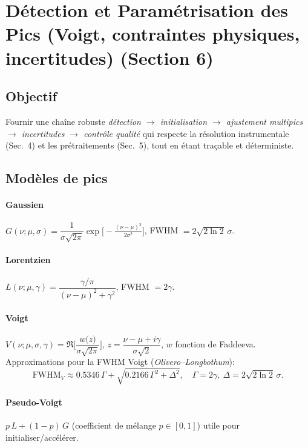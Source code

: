 
\section{Détection et Paramétrisation des Pics (Voigt, contraintes physiques, incertitudes) (Section 6)}

\subsection{Objectif}
Fournir une chaîne robuste \emph{détection $\rightarrow$ initialisation $\rightarrow$ ajustement multipics $\rightarrow$ incertitudes $\rightarrow$ contrôle qualité} qui respecte la résolution instrumentale (Sec.~4) et les prétraitements (Sec.~5), tout en étant traçable et déterministe.

\subsection{Modèles de pics}
\paragraph{Gaussien} $G(\nu;\mu,\sigma)=\dfrac{1}{\sigma\sqrt{2\pi}}\exp\!\big[-\tfrac{(\nu-\mu)^2}{2\sigma^2}\big]$, FWHM $=2\sqrt{2\ln2}\,\sigma$.
\paragraph{Lorentzien} $L(\nu;\mu,\gamma)=\dfrac{\gamma/\pi}{(\nu-\mu)^2+\gamma^2}$, FWHM $=2\gamma$.
\paragraph{Voigt} $V(\nu;\mu,\sigma,\gamma)=\Re\!\Big[\dfrac{w\!\big(z\big)}{\sigma\sqrt{2\pi}}\Big]$, $z=\dfrac{\nu-\mu+i\gamma}{\sigma\sqrt{2}}$, $w$ fonction de Faddeeva. Approximations pour la FWHM Voigt (\emph{Olivero--Longbothum}):
\begin{equation}
\mathrm{FWHM}_V \approx 0.5346\,\Gamma + \sqrt{0.2166\,\Gamma^2 + \Delta^2},\quad \Gamma=2\gamma,\ \Delta=2\sqrt{2\ln2}\,\sigma.
\end{equation}
\paragraph{Pseudo-Voigt} $p\,L + (1-p)\,G$ (coefficient de mélange $p\in[0,1]$) utile pour initialiser/accélérer.

